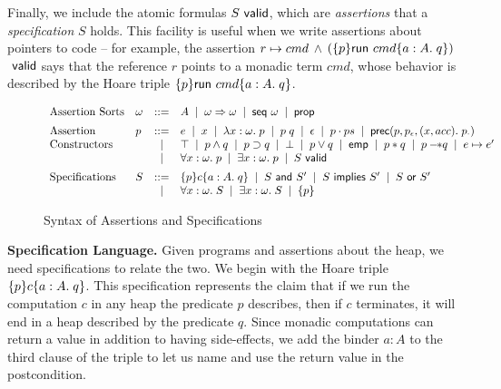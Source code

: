 \documentclass[preprint,natbib]{sigplanconf}
\begin{document}
Finally, we include the atomic formulas ${S}\mbox{\textsf{{ valid}}}$, which are
\emph{assertions} that a \emph{specification} $S$ holds. This facility
is useful when we write assertions about pointers to code -- for
example, the assertion $r \mapsto cmd$ $\land$
$(\{{p}\}{\mbox{\textsf{{run }}}{cmd}}\{{a:A}.\;{q}\})$ $\mbox{\textsf{{ valid}}}$ says that the reference $r$
points to a monadic term $cmd$, whose behavior is described by the
Hoare triple $\{{p}\}{\mbox{\textsf{{run }}}{cmd}}\{{a:A}.\;{q}\}$.

\begin{figure}
\begin{displaymath}
\begin{array}{llcl}
\mbox{Assertion Sorts} & 
\omega & ::= & A \;\;|\;\; \omega \Rightarrow \omega \;\;|\;\; \mbox{\textsf{{seq }}}{\omega} 
               \;\;|\;\; \mbox{\textsf{{prop}}} 
\\[0.5em]
\mbox{Assertion} & 
p & ::= & e \;\;|\;\; x \;\;|\;\; \lambda x:\omega.\;p \;\;|\;\; p\;q \;\;|\;\;
          \epsilon \;\;|\;\; p \cdot ps \;\;|\;\; 
          \mbox{\textsf{{prec}}}(p, {p_{\epsilon}}, (x,acc).\; {p_\cdot}) \\
\mbox{Constructors}& &  |  & \top \;\;|\;\; p \land q \;\;|\;\; p \supset q 
          \;\;|\;\; \bot \;\;|\;\; p \vee q \;\;|\;\;
          \mathsf{emp} \;\;|\;\; p * q \;\;|\;\; p -\!\!* q \;\;|\;\; e \mapsto e' \\
& &  |  & \forall x:\omega.\; p \;\;|\;\; \exists x:\omega.\; p \;\;|\;\;
          {S}\mbox{\textsf{{ valid}}} 
\\[0.5em]
\mbox{Specifications} &
S & ::= & \{{p}\}{c}\{{a:A}.\;{q}\} \;\;|\;\; S \mbox{\textsf{{ and }}} S' \;\;|\;\;
          S \mbox{\textsf{{ implies }}} S' \;\;|\;\; S \mbox{\textsf{{ or }}} S' \\
& &  |  & \forall x:\omega.\; S \;\;|\;\; \exists x:\omega.\;S \;\;|\;\; \{{p}\}
\\
\end{array}
\end{displaymath}
\caption{Syntax of Assertions and Specifications}
\label{assert-syntax}
\end{figure}
\textbf{Specification Language.} Given programs and assertions about
the heap, we need specifications to relate the two. We begin with the
Hoare triple $\{{p}\}{c}\{{a:A}.\;{q}\}$. This specification represents the
claim that if we run the computation $c$ in any heap the predicate $p$
describes, then if $c$ terminates, it will end in a heap described by
the predicate $q$. Since monadic computations can return a value in
addition to having side-effects, we add the binder $a:A$ to the third
clause of the triple to let us name and use the return value in the
postcondition.
\end{document}
